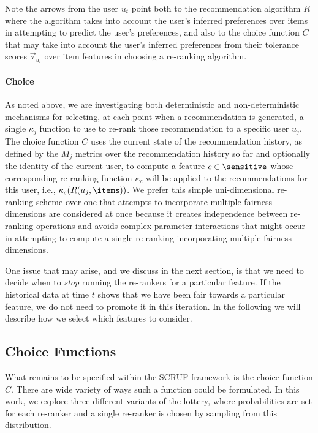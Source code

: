 Note the arrows from the user $u_t$ point both to the recommendation algorithm $R$ where the algorithm takes into account the user's inferred preferences over items in attempting to predict the user's preferences, and also to the choice function $C$ that may take into account the user's inferred preferences from their tolerance scores $\vec{\tau}_{u_i}$ over item features in choosing a re-ranking algorithm. 

\noindent \paragraph{Choice} \newline
\indent As noted above, we are investigating both deterministic and non-deterministic mechanisms for selecting, at each point when a recommendation is generated, a single $\kappa_j$ function to use to re-rank those recommendation to a specific user $u_j$. The choice function $C$ uses the current state of the recommendation history, as defined by the $M_j$ metrics over the recommendation history so far and optionally the identity of the current user, to compute a feature $c \in \sensitive$  whose corresponding re-ranking function $\kappa_c$ will be applied to the recommendations for this user, i.e., $\kappa_c(R(u_j, \items))$. We prefer this simple uni-dimensional re-ranking scheme over one that attempts to incorporate multiple fairness dimensions are considered at once because it creates independence between re-ranking operations and avoids complex parameter interactions that might occur in attempting to compute a single re-ranking incorporating multiple fairness dimensions.

One issue that may arise, and we discuss in the next section, is that we need to decide when to \emph{stop} running the re-rankers for a particular feature. If the historical data at time $t$ shows that we have been fair towards a particular feature, we do not need to promote it in this iteration. In the following we will describe how we select which features to consider.

\subsection{Choice Functions}

What remains to be specified within the SCRUF framework is the choice function $C$. There are wide variety of ways such a function could be formulated. In this work, we explore three different variants of the lottery, where probabilities are set for each re-ranker and a single re-ranker is chosen by sampling from this distribution.

